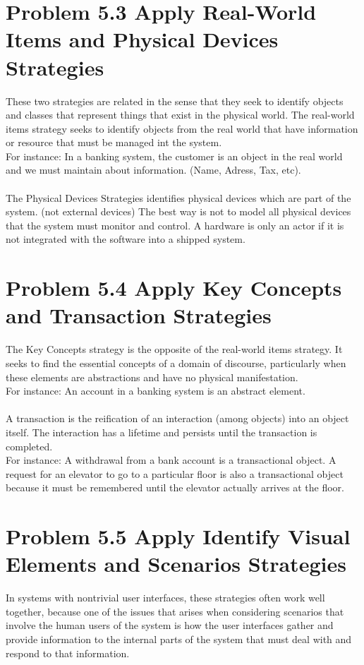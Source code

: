 \documentclass[12pt,a4paper]{article}
\begin{document}
\section{Problem 5.3 Apply Real-World Items and Physical Devices Strategies}
These two strategies are related in the sense that they seek to identify objects and
classes that represent things that exist in the physical world. The real-world items strategy seeks to identify objects from the real world that have information or resource that must be managed int the system. \\
 For instance: In a banking system, the customer is an object in the real world and we must maintain about information. (Name, Adress, Tax, etc).
 \\ \\
The Physical Devices Strategies identifies physical devices which are part of the system. (not external devices) The best way is not to model all physical devices that the system must monitor and control. A hardware is only
an actor if it is not integrated with the software into a shipped system.

\section{Problem 5.4 Apply Key Concepts and Transaction Strategies}
The Key Concepts strategy is the opposite of the real-world items strategy. It seeks
to find the essential concepts of a domain of discourse, particularly when these elements are abstractions and have no physical manifestation. \\ 
For instance: An account in a banking system is an abstract element.
 \\ \\
 
A transaction is the reification of an interaction (among objects) into an object itself. The interaction has a lifetime and persists until the transaction is completed. \\
For instance:  A withdrawal from a bank account is a transactional object. A request for an elevator to go to a particular floor is also a transactional object because it must be remembered until the elevator actually arrives at the floor.

\section{Problem 5.5 Apply Identify Visual Elements and Scenarios Strategies}
In systems with nontrivial user interfaces, these strategies often
work well together, because one of the issues that arises when considering scenarios that involve the human users of the system is how the user interfaces gather and provide information to the internal parts of the system that must deal with and respond to that information. \\
\end{document}

